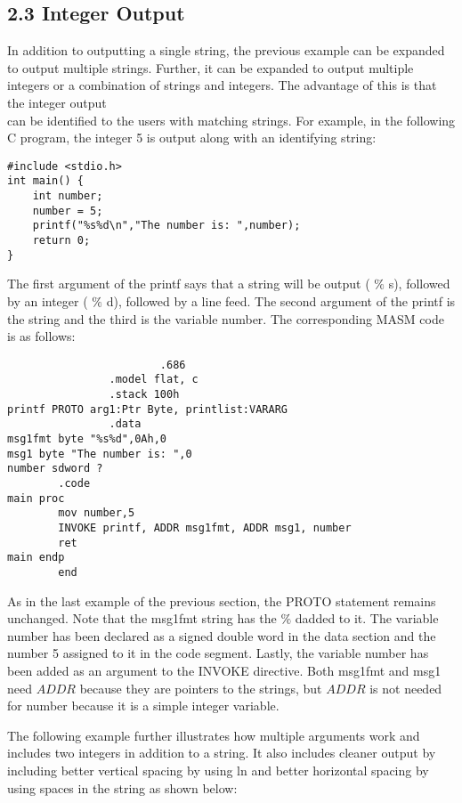 \documentclass[10pt]{article}
\begin{document}
\subsection*{2.3 Integer Output}
In addition to outputting a single string, the previous example can be expanded to output multiple strings. Further, it can be expanded to output multiple integers or a combination of strings and integers. The advantage of this is that the integer output\\
can be identified to the users with matching strings. For example, in the following C program, the integer 5 is output along with an identifying string:

\begin{verbatim}
#include <stdio.h>
int main() {
    int number;
    number = 5;
    printf("%s%d\n","The number is: ",number);
    return 0;
}
\end{verbatim}

The first argument of the printf says that a string will be output ( $\%$ s), followed by an integer ( $\%$ d), followed by a line feed. The second argument of the printf is the string and the third is the variable number. The corresponding MASM code is as follows:

\begin{verbatim}
                        .686
                .model flat, c
                .stack 100h
printf PROTO arg1:Ptr Byte, printlist:VARARG
                .data
msg1fmt byte "%s%d",0Ah,0
msg1 byte "The number is: ",0
number sdword ?
        .code
main proc
        mov number,5
        INVOKE printf, ADDR msg1fmt, ADDR msg1, number
        ret
main endp
        end
\end{verbatim}

As in the last example of the previous section, the PROTO statement remains unchanged. Note that the msg1fmt string has the $\%$ dadded to it. The variable number has been declared as a signed double word in the data section and the number 5 assigned to it in the code segment. Lastly, the variable number has been added as an argument to the INVOKE directive. Both msg1fmt and msg1 need $A D D R$ because they are pointers to the strings, but $A D D R$ is not needed for number because it is a simple integer variable.

The following example further illustrates how multiple arguments work and includes two integers in addition to a string. It also includes cleaner output by including better vertical spacing by using ln and better horizontal spacing by using spaces in the string as shown below:
\end{document}
